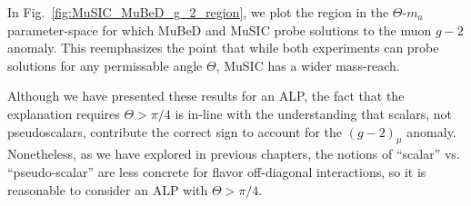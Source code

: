 In Fig.~\ref{fig:MuSIC_MuBeD_g_2_region}, we plot the region in the $\Theta$-$m_a$ parameter-space for which MuBeD and MuSIC probe solutions to the muon $g-2$ anomaly. This reemphasizes the point that while both experiments can probe solutions for any permissable angle $\Theta$, MuSIC has a wider mass-reach. 

Although we have presented these results for an ALP, the fact that the explanation requires $\Theta > \pi/4$ is in-line with the understanding that scalars, not pseudoscalars, contribute the correct sign to account for the $(g-2)_\mu$ anomaly. Nonetheless, as we have explored in previous chapters, the notions of ``scalar'' vs. ``pseudo-scalar'' are less concrete for flavor off-diagonal interactions, so it is reasonable to consider an ALP with $\Theta > \pi/4$.

